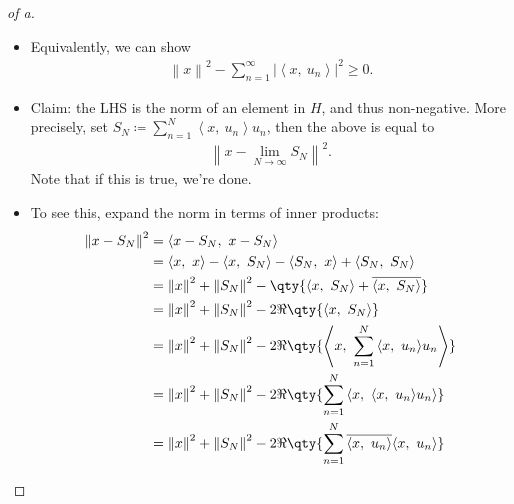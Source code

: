 \begin{solution}

\envlist

\begin{proof}[of a]

\envlist

\begin{itemize}
\item
  Equivalently, we can show
  \begin{align*}
  {\left\lVert {x} \right\rVert}^2 - \sum_{n=1}^\infty {\left\lvert { {\left\langle {x},~{u_n} \right\rangle} } \right\rvert}^2 \geq 0
  .\end{align*}
\item
  Claim: the LHS is the norm of an element in \(H\), and thus
  non-negative. More precisely, set
  \(S_N\coloneqq\sum_{n=1}^N {\left\langle {x},~{u_n} \right\rangle}u_n\),
  then the above is equal to
  \begin{align*}
  {\left\lVert {x - \lim_{N\to\infty} S_N} \right\rVert}^2
  .\end{align*}
  Note that if this is true, we're done.
\item
  To see this, expand the norm in terms of inner products:
  \begin{align*}
  {\left\lVert {x - S_N} \right\rVert}^2
  &= {\left\langle {x-S_N},~{x-S_N} \right\rangle} \\
  &= {\left\langle {x},~{x} \right\rangle} - {\left\langle {x},~{S_N} \right\rangle} - {\left\langle {S_N},~{x} \right\rangle} + {\left\langle {S_N},~{S_N} \right\rangle} \\
  &= {\left\lVert {x} \right\rVert}^2 + {\left\lVert {S_N} \right\rVert}^2 - \qty{{\left\langle {x},~{S_N} \right\rangle} + {\overline{{{\left\langle {x},~{S_N} \right\rangle}}}} } \\
  &= {\left\lVert {x} \right\rVert}^2 + {\left\lVert {S_N} \right\rVert}^2 - 2\Re\qty{{\left\langle {x},~{S_N} \right\rangle} } \\
  &= {\left\lVert {x} \right\rVert}^2 + {\left\lVert {S_N} \right\rVert}^2 - 2\Re\qty{ {\left\langle {x},~{\sum_{n=1}^N {\left\langle {x},~{u_n} \right\rangle} u_n } \right\rangle} } \\
  &= {\left\lVert {x} \right\rVert}^2 + {\left\lVert {S_N} \right\rVert}^2 - 2\Re\qty{ \sum_{n=1}^N {\left\langle {x},~{{\left\langle {x},~{u_n} \right\rangle} u_n } \right\rangle} } \\
  &= {\left\lVert {x} \right\rVert}^2 + {\left\lVert {S_N} \right\rVert}^2 - 2\Re\qty{ \sum_{n=1}^N {\overline{{{\left\langle {x},~{u_n} \right\rangle} }}} {\left\langle {x},~{u_n } \right\rangle} } \\

\end{align*}
\end{itemize}
\end{proof}
\end{solution}
